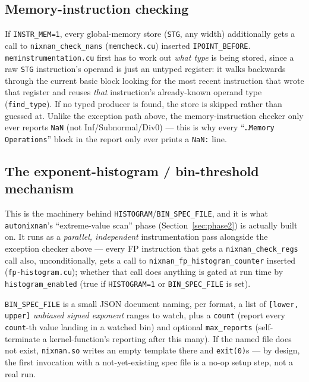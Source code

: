 \documentclass[11pt]{article}
\begin{document}
\subsection{Memory-instruction checking}
\label{sec:memcheck}

If \texttt{INSTR\_MEM=1}, every global-memory store (\texttt{STG}, any
width) additionally gets a call to \texttt{nixnan\_check\_nans}
(\texttt{memcheck.cu}) inserted \texttt{IPOINT\_BEFORE}.
\texttt{meminstrumentation.cu} first has to work out \emph{what type} is
being stored, since a raw \texttt{STG} instruction's operand is just an
untyped register: it walks backwards through the current basic block
looking for the most recent instruction that wrote that register and
reuses \emph{that} instruction's already-known operand type
(\texttt{find\_type}). If no typed producer is found, the store is
skipped rather than guessed at. Unlike the exception path above, the
memory-instruction checker only ever reports \texttt{NaN} (not
Inf/Subnormal/Div0) --- this is why every ``\texttt{\ldots Memory
Operations}'' block in the report only ever prints a \texttt{NaN:} line.

\subsection{The exponent-histogram / bin-threshold mechanism}
\label{sec:histogram}

This is the machinery behind \texttt{HISTOGRAM}/\texttt{BIN\_SPEC\_FILE},
and it is what \texttt{autonixnan}'s ``extreme-value scan'' phase
(Section~\ref{sec:phase2}) is actually built on. It runs as a
\emph{parallel, independent} instrumentation pass alongside the exception
checker above --- every FP instruction that gets a
\texttt{nixnan\_check\_regs} call also, unconditionally, gets a call to
\texttt{nixnan\_fp\_histogram\_counter} inserted (\texttt{fp-histogram.cu});
whether that call does anything is gated at run time by
\texttt{histogram\_enabled} (true if \texttt{HISTOGRAM=1} or
\texttt{BIN\_SPEC\_FILE} is set).

\texttt{BIN\_SPEC\_FILE} is a small JSON document naming, per format, a
list of \texttt{[lower, upper]} \emph{unbiased signed exponent} ranges to
watch, plus a \texttt{count} (report every \texttt{count}-th value landing
in a watched bin) and optional \texttt{max\_reports} (self-terminate a
kernel-function's reporting after this many). If the named file does not
exist, \texttt{nixnan.so} writes an empty template there and
\texttt{exit(0)}s --- by design, the first invocation with a
not-yet-existing spec file is a no-op setup step, not a real run.
\end{document}

